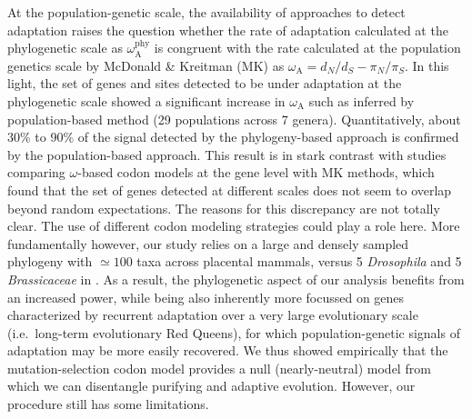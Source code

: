 \documentclass{article}
\newcommand{\dn}{d_N}
\newcommand{\ds}{d_S}
\newcommand{\dnds}{\dn / \ds}
\newcommand{\rateApop}{\omega_{\mathrm{A}}}
\newcommand{\rateAphy}{\rateApop^{\mathrm{phy}}}
\newcommand{\pn}{\pi_N}
\newcommand{\ps}{\pi_S}
\newcommand{\pnps}{\pn / \ps}
\begin{document}
    At the population-genetic scale, the availability of approaches to detect adaptation\cite{mcdonald_adaptative_1991, messer_frequent_2013} raises the question whether the rate of adaptation calculated at the phylogenetic scale as $\rateAphy$ is congruent with the rate calculated at the population genetics scale by McDonald \& Kreitman (MK)\cite{mcdonald_adaptative_1991} as $\rateApop = \dnds - \pnps$.
    In this light, the set of genes and sites detected to be under adaptation at the phylogenetic scale showed a significant increase in $\rateApop$ such as inferred by population-based method (29 populations across 7 genera).
    Quantitatively, about 30\% to 90\% of the signal detected by the phylogeny-based approach is confirmed by the population-based approach.
    This result is in stark contrast with studies comparing $\omega$-based codon models at the gene level with MK methods, which found that the set of genes detected at different scales does not seem to overlap beyond random expectations\cite{chen_two_2021}.
    The reasons for this discrepancy are not totally clear.
    The use of different codon modeling strategies could play a role here.
    More fundamentally however, our study relies on a large and densely sampled phylogeny with $\simeq 100$ taxa across placental mammals, versus 5 \textit{Drosophila} and 5 \textit{Brassicaceae} in \textcite{chen_two_2021}.
    As a result, the phylogenetic aspect of our analysis benefits from an increased power, while being also inherently more focussed on genes characterized by recurrent adaptation over a very large evolutionary scale (i.e.~long-term evolutionary Red Queens), for which population-genetic signals of adaptation may be more easily recovered.
    We thus showed empirically that the mutation-selection codon model provides a null (nearly-neutral) model from which we can disentangle purifying and adaptive evolution.
    However, our procedure still has some limitations.
\end{document}
